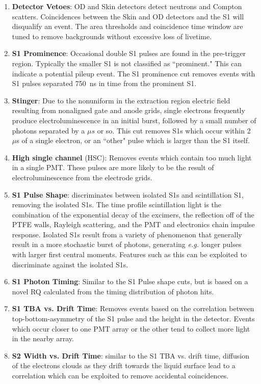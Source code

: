 \begin{enumerate}
    \item \textbf{Detector Vetoes}: OD and Skin detectors detect neutrons and Compton scatters. Coincidences between the Skin and OD detectors and the S1 will disqualify an event. The area thresholds and coincidence time window are tuned to remove backgrounds without excessive loss of livetime.
    \item \textbf{S1 Prominence}: Occasional double S1 pulses are found in the pre-trigger region.
    Typically the smaller S1 is not classified as ``prominent." This can indicate a potential pileup event.
    The S1 prominence cut removes events with S1 pulses separated 750~ns in time from the prominent S1.
    \item \textbf{Stinger}: Due to the nonuniform  in the extraction region electric field resulting from nonaligned gate and anode grids, single electrons frequently produce electroluminescence in an initial burst, followed by a small number of photons separated by a $\mu s$ or so. 
    This cut removes S1s which occur within 2~$\mu$s of a single electron, or an ``other" pulse which is larger than the S1 itself.
    \item \textbf{High single channel} (HSC): Removes events which contain too much light in a single PMT.
    These pulses are more likely to be the result of electroluminescence from the electrode grids.
    \item \textbf{S1 Pulse Shape}: discriminates between isolated S1s and scintillation S1, removing the isolated S1s.
    The time profile scintillation light is the combination of the exponential decay of the excimers, the reflection off of the PTFE walls, Rayleigh scattering, and the PMT and electronics chain impulse response. 
    Isolated S1s result from a variety of phenomenon that generally result in a more stochastic burst of photons, generating \textit{e.g.} longer pulses with larger first central moments. 
    Features such as this can be exploited to discriminate against the isolated S1s.
    \item \textbf{S1 Photon Timing}: Similar to the S1 Pulse shape cuts, but is based on a novel RQ calculated from the timing distribution of photon hits.
    \item \textbf{S1 TBA vs. Drift Time}: Removes events based on the correlation between top-bottom-asymmetry of the S1 pulse and the height in the detector.
    Events which occur closer to one PMT array or the other tend to collect more light in the nearby array.
    \item \textbf{S2 Width vs. Drift Time}: similar to the S1 TBA vs. drift time, diffusion of the electrons clouds as they drift towards the liquid surface lead to a correlation which can be exploited to remove accidental coincidences.

\end{enumerate}
